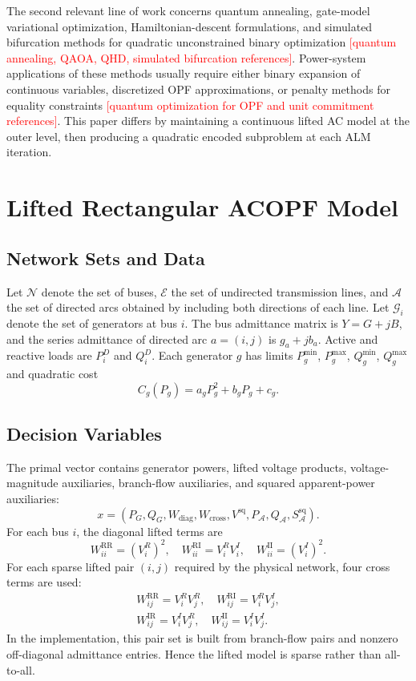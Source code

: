 \documentclass[journal]{IEEEtran}
\newcommand{\needref}[1]{\textcolor{red}{[#1]}}
\newcommand{\RR}{\mathrm{RR}}
\newcommand{\RI}{\mathrm{RI}}
\newcommand{\IR}{\mathrm{IR}}
\newcommand{\II}{\mathrm{II}}
\newcommand{\diag}{\mathrm{diag}}
\newcommand{\sq}{\mathrm{sq}}
\begin{document}
The second relevant line of work concerns quantum annealing, gate-model variational optimization, Hamiltonian-descent formulations, and simulated bifurcation methods for quadratic unconstrained binary optimization \needref{quantum annealing, QAOA, QHD, simulated bifurcation references}. Power-system applications of these methods usually require either binary expansion of continuous variables, discretized OPF approximations, or penalty methods for equality constraints \needref{quantum optimization for OPF and unit commitment references}. This paper differs by maintaining a continuous lifted AC model at the outer level, then producing a quadratic encoded subproblem at each ALM iteration.

\section{Lifted Rectangular ACOPF Model}
\subsection{Network Sets and Data}
Let $\mathcal N$ denote the set of buses, $\mathcal E$ the set of undirected transmission lines, and $\mathcal A$ the set of directed arcs obtained by including both directions of each line. Let $\mathcal G_i$ denote the set of generators at bus $i$. The bus admittance matrix is $Y=G+jB$, and the series admittance of directed arc $a=(i,j)$ is $g_a+j b_a$. Active and reactive loads are $P_i^D$ and $Q_i^D$. Each generator $g$ has limits $P_g^{\min}$, $P_g^{\max}$, $Q_g^{\min}$, $Q_g^{\max}$ and quadratic cost
\begin{equation}
    C_g(P_g)=a_g P_g^2+b_g P_g+c_g .
\end{equation}

\subsection{Decision Variables}
The primal vector contains generator powers, lifted voltage products, voltage-magnitude auxiliaries, branch-flow auxiliaries, and squared apparent-power auxiliaries:
\begin{equation}
    x=\left(P_G,Q_G,W_{\diag},W_{\mathrm{cross}},V^{\sq},P_{\mathcal A},Q_{\mathcal A},S_{\mathcal A}^{\sq}\right).
\end{equation}
For each bus $i$, the diagonal lifted terms are
\begin{equation}
    W_{ii}^{\RR}=(V_i^R)^2,\quad
    W_{ii}^{\RI}=V_i^R V_i^I,\quad
    W_{ii}^{\II}=(V_i^I)^2 .
\end{equation}
For each sparse lifted pair $(i,j)$ required by the physical network, four cross terms are used:
\begin{equation}
\begin{aligned}
    W_{ij}^{\RR}=V_i^R V_j^R,\quad
    W_{ij}^{\RI}=V_i^R V_j^I,\\
    W_{ij}^{\IR}=V_i^I V_j^R,\quad
    W_{ij}^{\II}=V_i^I V_j^I .
\end{aligned}
\end{equation}
In the implementation, this pair set is built from branch-flow pairs and nonzero off-diagonal admittance entries. Hence the lifted model is sparse rather than all-to-all.
\end{document}
